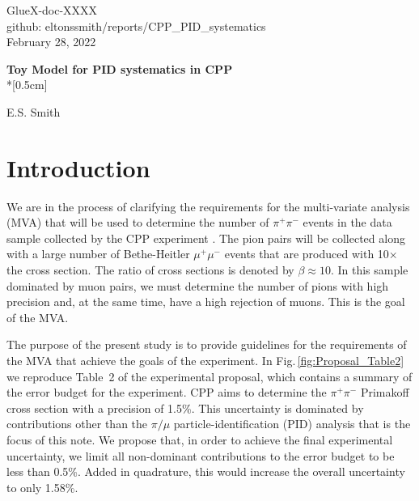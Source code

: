 \documentclass[12pt]{article}
\begin{document}
\begin{flushright}
GlueX-doc-XXXX\\
github: eltonssmith/reports/CPP\_PID\_systematics\\
February 28, 2022
\end{flushright}




\begin{center}
{\Large \bf Toy Model for PID systematics in CPP}\\*[0.5cm]
\end{center}

\begin{center}   
{\sc  E.S. Smith}\\  
\end{center}


\section{Introduction}
We are in the process of clarifying the requirements for the multi-variate analysis (MVA) that will be used to determine the number
of $\pi^+\pi^-$ events in the data sample collected by the CPP experiment \cite{CPPexp}.  The pion pairs will be collected along with 
a large number of Bethe-Heitler $\mu^+\mu^-$ events that are produced with 10$\times$ the cross section. The ratio of cross sections is 
denoted by $\beta\approx 10$. In this sample dominated by muon pairs, we must determine the number of pions with high precision
and, at the same time, have a high rejection of muons. This is the goal of the MVA. 

The purpose of the present study is to provide guidelines for the requirements of the MVA that achieve the goals of the experiment. In Fig.\,\ref{fig:Proposal_Table2} 
we reproduce Table~2 of the experimental proposal, which contains a summary of the error budget for the experiment. CPP aims to determine
the $\pi^+\pi^-$ Primakoff cross section with a precision of 1.5\%. This uncertainty is dominated by contributions other than the $\pi/\mu$ 
particle-identification (PID) analysis that is the focus of this note. We propose that, in order to achieve the final experimental uncertainty, 
we limit all non-dominant contributions to the error budget to be less than 0.5\%. Added in quadrature, this would increase the overall uncertainty to only 1.58\%. 
\end{document}
